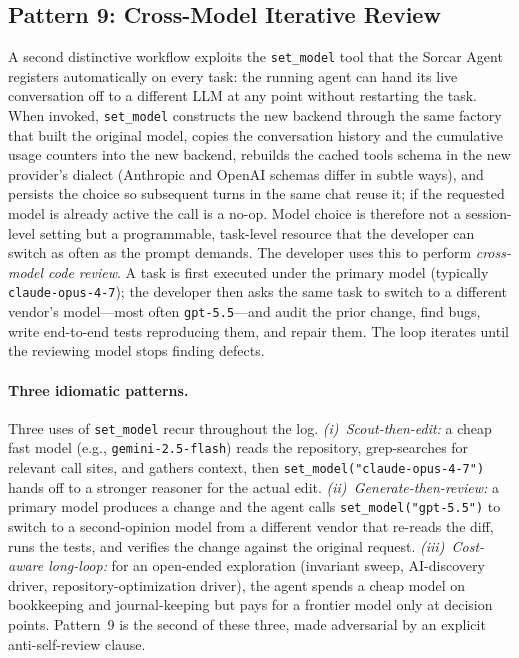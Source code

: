 \documentclass{article}
\begin{document}
\subsection{Pattern 9: Cross-Model Iterative Review}
\label{sec:p-cross-model}

A second distinctive workflow exploits the \texttt{set\_model} tool
that the Sorcar Agent registers automatically on every task: the
running agent can hand its live conversation off to a different LLM
at any point without restarting the task.  When invoked,
\texttt{set\_model} constructs the new backend through the same
factory that built the original model, copies the conversation
history and the cumulative usage counters into the new backend,
rebuilds the cached tools schema in the new provider's dialect
(Anthropic and OpenAI schemas differ in subtle ways), and persists
the choice so subsequent turns in the same chat reuse it; if the
requested model is already active the call is a no-op.  Model choice
is therefore not a session-level setting but a programmable,
task-level resource that the developer can switch as often as the
prompt demands.
The developer uses this to perform \emph{cross-model code review}.
A task is first executed under the primary model (typically
\texttt{claude-opus-4-7}); the developer then asks the same task to
switch to a different vendor's model---most often
\texttt{gpt-5.5}---and audit the prior change, find bugs, write
end-to-end tests reproducing them, and repair them.
The loop iterates until the reviewing model stops finding defects.

\paragraph{Three idiomatic patterns.}
Three uses of \texttt{set\_model} recur throughout the log.
\emph{(i)~Scout-then-edit:} a cheap fast model (e.g.,
\texttt{gemini-2.5-flash}) reads the repository, grep-searches for
relevant call sites, and gathers context, then
\texttt{set\_model("claude-opus-4-7")} hands off to a stronger
reasoner for the actual edit.
\emph{(ii)~Generate-then-review:} a primary model produces a change
and the agent calls \texttt{set\_model("gpt-5.5")} to switch to a
second-opinion model from a different vendor that re-reads the diff,
runs the tests, and verifies the change against the original
request.
\emph{(iii)~Cost-aware long-loop:} for an open-ended exploration
(invariant sweep, AI-discovery driver, repository-optimization
driver), the agent spends a cheap model on bookkeeping and
journal-keeping but pays for a frontier model only at decision
points.
Pattern~9 is the second of these three, made adversarial by an
explicit anti-self-review clause.
\end{document}
